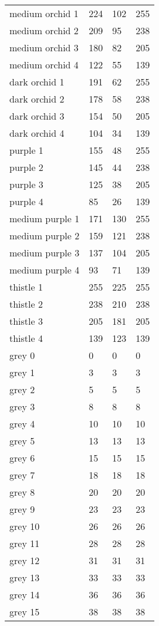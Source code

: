 \begin{center}
\begin{tabular}{llll}
  medium orchid 1 & 224 & 102 & 255  \\
  medium orchid 2 & 209 & 95 & 238  \\
  medium orchid 3 & 180 & 82 & 205  \\
  medium orchid 4 & 122 & 55 & 139  \\
  dark orchid 1 & 191 & 62 & 255  \\
  dark orchid 2 & 178 & 58 & 238  \\
  dark orchid 3 & 154 & 50 & 205  \\
  dark orchid 4 & 104 & 34 & 139  \\
  purple 1 & 155 & 48 & 255  \\
  purple 2 & 145 & 44 & 238  \\
  purple 3 & 125 & 38 & 205  \\
  purple 4 & 85 & 26 & 139  \\
  medium purple 1 & 171 & 130 & 255  \\
  medium purple 2 & 159 & 121 & 238  \\
  medium purple 3 & 137 & 104 & 205  \\
  medium purple 4 & 93 & 71 & 139  \\
  thistle 1 & 255 & 225 & 255  \\
  thistle 2 & 238 & 210 & 238  \\
  thistle 3 & 205 & 181 & 205  \\
  thistle 4 & 139 & 123 & 139  \\
  grey 0 & 0 & 0 & 0  \\
  grey 1 & 3 & 3 & 3  \\
  grey 2 & 5 & 5 & 5  \\
  grey 3 & 8 & 8 & 8  \\
  grey 4 & 10 & 10 & 10  \\
  grey 5 & 13 & 13 & 13  \\
  grey 6 & 15 & 15 & 15  \\
  grey 7 & 18 & 18 & 18  \\
  grey 8 & 20 & 20 & 20  \\
  grey 9 & 23 & 23 & 23  \\
  grey 10 & 26 & 26 & 26  \\
  grey 11 & 28 & 28 & 28  \\
  grey 12 & 31 & 31 & 31  \\
  grey 13 & 33 & 33 & 33  \\
  grey 14 & 36 & 36 & 36  \\
  grey 15 & 38 & 38 & 38  \\

\end{tabular}
\end{center}
